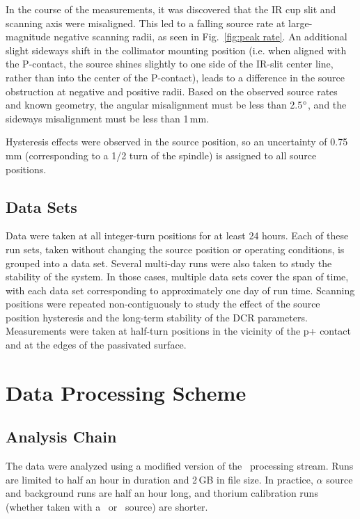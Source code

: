 In the course of the measurements, it was discovered that the IR cup slit and scanning axis were misaligned. This led to a falling source rate at large-magnitude negative scanning radii, as seen in Fig.~\ref{fig:peak rate}. An additional slight sideways shift in the collimator mounting position (i.e. when aligned with the P-contact, the source shines slightly to one side of the IR-slit center line, rather than into the center of the P-contact), leads to a difference in the source obstruction at negative and positive radii. Based on the observed source rates and known geometry, the angular misalignment must be less than 2.5$\degree$, and the sideways misalignment must be less than 1\,mm. 

Hysteresis effects were observed in the source position, so an uncertainty of 0.75\,mm (corresponding to a 1/2 turn of the spindle) is assigned to all source positions. 

\subsection{Data Sets}
Data were taken at all integer-turn positions for at least 24 hours. Each of these run sets, taken without changing the source position or operating conditions, is grouped into a data set. Several multi-day runs were also taken to study the stability of the system. In those cases, multiple data sets cover the span of time, with each data set corresponding to approximately one day of run time. Scanning positions were repeated non-contiguously to study the effect of the source position hysteresis and the long-term stability of the DCR parameters. Measurements were taken at half-turn positions in the vicinity of the p+ contact and at the edges of the passivated surface.  

%

\section{Data Processing Scheme}
\subsection{Analysis Chain}
The data were analyzed using a modified version of the \MJ\ processing stream. Runs are limited to half an hour in duration and 2\,GB in file size. In practice, $\alpha$ source and background runs are half an hour long, and thorium calibration runs (whether taken with a \thtte\ or \thttt\ source) are shorter.


